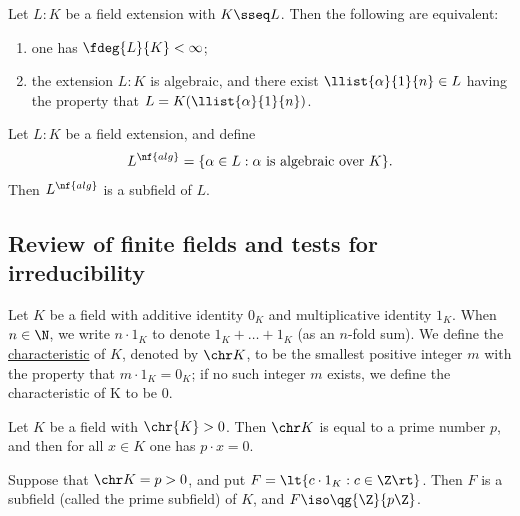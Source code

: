 \documentclass{article}
\begin{document}
  \begin{ttheorem}
    Let \( L:K \) be a field extension with \( K\sseq L \).
    Then the following are equivalent:
    \begin{enumerate}[label=(\roman*)]
      \item one has \( \fdeg{L}{K}<\infty \);
      \item the extension \( L:K \) is algebraic, and there exist \( \llist{\alpha}{1}{n}\in L \) having the property that \( L=K(\llist{\alpha}{1}{n}) \).
    \end{enumerate}
  \end{ttheorem}

  \begin{tproposition}
    Let \( L:K \) be a field extension, and define \begin{align*}
      L^{\nf{alg}}=\{\alpha\in L : \alpha \text{ is algebraic over } K\}.
    \end{align*}
    Then \( L^{\nf{alg}} \) is a subfield of \( L \).
  \end{tproposition}

\subsection{Review of finite fields and tests for irreducibility}
  \begin{tdefinition}[Characteristic]
    Let \( K \) be a field with additive identity \( 0_K \) and multiplicative identity \( 1_K \).
    When \( n\in \N \), we write \( n\cdot 1_K \) to denote \( 1_K+\ldots+ 1_K \) (as an \( n \)-fold sum).
    We define the \ul{characteristic} of \( K \), denoted by \( \chr K \), to be the smallest positive integer \( m \) with the property that \( m\cdot 1_K = 0_K \);
    if no such integer \( m \) exists, we define the characteristic of K to be 0.
  \end{tdefinition}

  \begin{tproposition}
    Let \( K \) be a field with \( \chr{K} > 0 \).
    Then \( \chr K \) is equal to a prime number \( p \), and then for all \( x\in K \) one has \( p\cdot x=0 \).
  \end{tproposition}

  \begin{ttheorem}
    Suppose that \( \chr K = p > 0 \), and put \( F=\lt\{ c\cdot 1_K : c\in \Z \rt\} \).
    Then \( F \) is a subfield (called the prime subfield) of \( K \), and \( F\iso \qg{\Z}{p\Z} \).
  \end{ttheorem}
\end{document}
